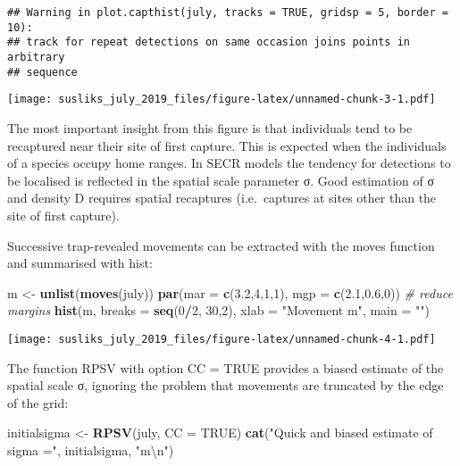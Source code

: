 \documentclass[]{article}
\newenvironment{Shaded}{\begin{snugshade}}{\end{snugshade}}
\newcommand{\CharTok}[1]{\textcolor[rgb]{0.31,0.60,0.02}{#1}}
\newcommand{\CommentTok}[1]{\textcolor[rgb]{0.56,0.35,0.01}{\textit{#1}}}
\newcommand{\DataTypeTok}[1]{\textcolor[rgb]{0.13,0.29,0.53}{#1}}
\newcommand{\DecValTok}[1]{\textcolor[rgb]{0.00,0.00,0.81}{#1}}
\newcommand{\FloatTok}[1]{\textcolor[rgb]{0.00,0.00,0.81}{#1}}
\newcommand{\KeywordTok}[1]{\textcolor[rgb]{0.13,0.29,0.53}{\textbf{#1}}}
\newcommand{\NormalTok}[1]{#1}
\newcommand{\OperatorTok}[1]{\textcolor[rgb]{0.81,0.36,0.00}{\textbf{#1}}}
\newcommand{\OtherTok}[1]{\textcolor[rgb]{0.56,0.35,0.01}{#1}}
\newcommand{\StringTok}[1]{\textcolor[rgb]{0.31,0.60,0.02}{#1}}
\begin{document}
\begin{verbatim}
## Warning in plot.capthist(july, tracks = TRUE, gridsp = 5, border = 10):
## track for repeat detections on same occasion joins points in arbitrary
## sequence
\end{verbatim}

\texttt{[image: susliks\_july\_2019\_files/figure-latex/unnamed-chunk-3-1.pdf]}

The most important insight from this figure is that individuals tend to
be recaptured near their site of first capture. This is expected when
the individuals of a species occupy home ranges. In SECR models the
tendency for detections to be localised is reflected in the spatial
scale parameter σ. Good estimation of σ and density D requires spatial
recaptures (i.e.~captures at sites other than the site of first
capture).

Successive trap-revealed movements can be extracted with the moves
function and summarised with hist:

\begin{Shaded}
\begin{Highlighting}[]
\NormalTok{m <-}\StringTok{ }\KeywordTok{unlist}\NormalTok{(}\KeywordTok{moves}\NormalTok{(july))}
\KeywordTok{par}\NormalTok{(}\DataTypeTok{mar =} \KeywordTok{c}\NormalTok{(}\FloatTok{3.2}\NormalTok{,}\DecValTok{4}\NormalTok{,}\DecValTok{1}\NormalTok{,}\DecValTok{1}\NormalTok{), }\DataTypeTok{mgp =} \KeywordTok{c}\NormalTok{(}\FloatTok{2.1}\NormalTok{,}\FloatTok{0.6}\NormalTok{,}\DecValTok{0}\NormalTok{)) }\CommentTok{# reduce margins}
\KeywordTok{hist}\NormalTok{(m, }\DataTypeTok{breaks =} \KeywordTok{seq}\NormalTok{(}\DecValTok{0}\OperatorTok{/}\DecValTok{2}\NormalTok{, }\DecValTok{30}\NormalTok{,}\DecValTok{2}\NormalTok{), }\DataTypeTok{xlab =} \StringTok{"Movement m"}\NormalTok{, }\DataTypeTok{main =} \StringTok{""}\NormalTok{)}
\end{Highlighting}
\end{Shaded}

\texttt{[image: susliks\_july\_2019\_files/figure-latex/unnamed-chunk-4-1.pdf]}

The function RPSV with option CC = TRUE provides a biased estimate of
the spatial scale σ, ignoring the problem that movements are truncated
by the edge of the grid:

\begin{Shaded}
\begin{Highlighting}[]
\NormalTok{initialsigma <-}\StringTok{ }\KeywordTok{RPSV}\NormalTok{(july, }\DataTypeTok{CC =} \OtherTok{TRUE}\NormalTok{)}
\KeywordTok{cat}\NormalTok{(}\StringTok{"Quick and biased estimate of sigma ="}\NormalTok{, initialsigma, }\StringTok{"m}\CharTok{\textbackslash{}n}\StringTok{"}\NormalTok{)}
\end{Highlighting}
\end{Shaded}
\end{document}
